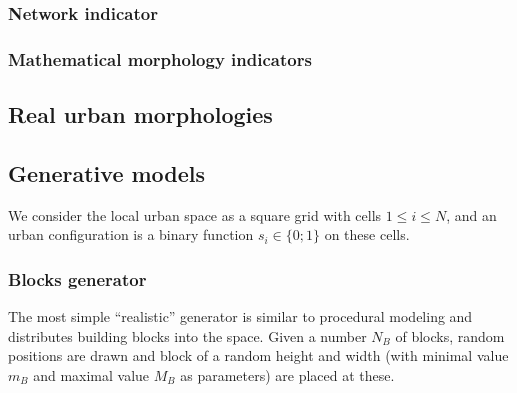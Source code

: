 \documentclass[letterpaper]{article}
\begin{document}
\subsubsection{Network indicator}


\subsubsection{Mathematical morphology indicators}










\subsection{Real urban morphologies}




\subsection{Generative models}

We consider the local urban space as a square grid with cells $1 \leq i \leq N$, and an urban configuration is a binary function $s_i \in \{0;1\}$ on these cells.





\subsubsection{Blocks generator}

The most simple ``realistic'' generator is similar to procedural modeling and distributes building blocks into the space. Given a number $N_B$ of blocks, random positions are drawn and block of a random height and width (with minimal value $m_B$ and maximal value $M_B$ as parameters) are placed at these.
\end{document}
